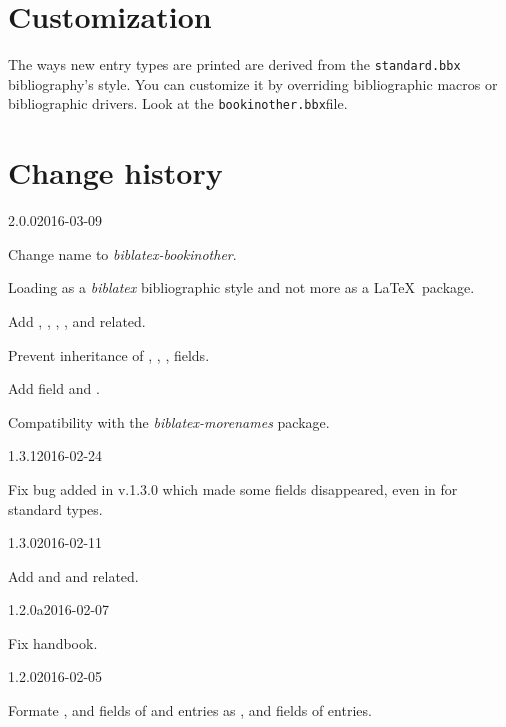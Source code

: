 \documentclass{ltxdockit}[2011/03/25]
\newcommand{\pkg}[1]{\emph{#1}}
\newcommand{\biblatex}{\emph{biblatex}\xspace}
\begin{document}
\section{Customization}

The ways new entry types are printed are derived from the \verb+standard.bbx+ bibliography's style. You can customize it by overriding bibliographic macros or bibliographic drivers. Look at the \verb+bookinother.bbx+file.

\section{Change history}


\begin{changelog}

\begin{release}{2.0.0}{2016-03-09}
\item Change name to \pkg{biblatex-bookinother}.
\item Loading as a \biblatex bibliographic style and not more as a \LaTeX\ package.
\item Add , , , ,  and related.
\item Prevent inheritance of , , ,  fields.
\item Add field  and .
\item Compatibility with the \pkg{biblatex-morenames} package.
\end{release}

\begin{release}{1.3.1}{2016-02-24}
\item Fix bug added in v.1.3.0 which made some fields disappeared, even in for standard types.
\end{release}

\begin{release}{1.3.0}{2016-02-11}
\item Add  and  and related.
\end{release}

\begin{release}{1.2.0a}{2016-02-07}
\item Fix handbook.
\end{release}

\begin{release}{1.2.0}{2016-02-05}
\item Formate   ,  and  fields of   and  entries as ,  and  fields of  entries.
\end{release}


\end{changelog}
\end{document}

